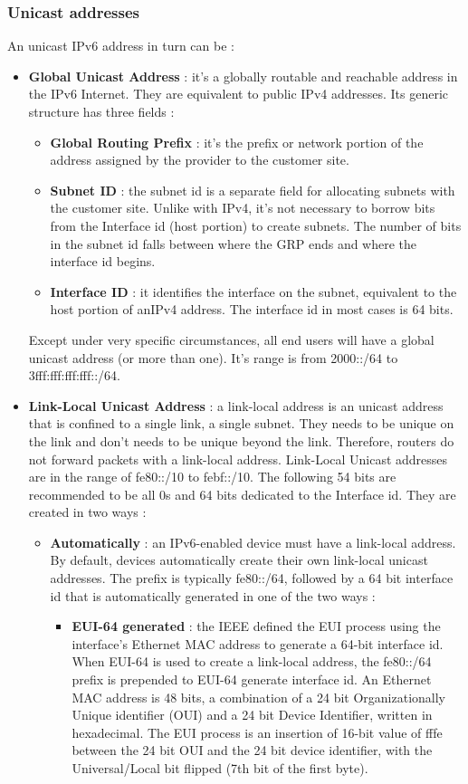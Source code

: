 \documentclass[11pt]{article}
\begin{document}
\subsubsection{Unicast addresses}
An unicast IPv6 address in turn can be :
\begin{itemize}
\item \textbf{Global Unicast Address} : it's a globally routable and reachable address in the IPv6 Internet. They are equivalent to public IPv4 addresses. Its generic structure has three fields :
\begin{itemize}
\item \textbf{Global Routing Prefix} : it's the prefix or network portion of the address assigned by the provider to the customer site.
\item \textbf{Subnet ID} : the subnet id is a separate field for allocating subnets with the customer site. Unlike with IPv4, it's not necessary to borrow bits from the Interface id (host portion) to create subnets. The number of bits in the subnet id falls between where the GRP ends and where the interface id begins.
\item \textbf{Interface ID} : it identifies the interface on the subnet, equivalent to the host portion of anIPv4 address. The interface id in most cases is 64 bits.
\end{itemize}
 Except under very specific circumstances, all end users will have a global unicast address (or more than one). It's range is from 2000::/64 to 3fff:fff:fff:fff::/64.
\item \textbf{Link-Local Unicast Address} : a link-local address is an unicast address that is confined to a single link, a single subnet. They needs to be unique on the link and don't needs to be unique beyond the link. Therefore, routers do not forward packets with a link-local address. Link-Local Unicast  addresses are in the range of fe80::/10 to febf::/10. The following 54 bits are recommended to be all 0s and 64 bits dedicated to the Interface id. They are created in two ways :
\begin{itemize}
\item \textbf{Automatically} : an IPv6-enabled device must have a link-local address. By default, devices automatically create their own link-local unicast addresses. The prefix is typically fe80::/64, followed by a 64 bit interface id that is automatically generated in one of the two ways :
\begin{itemize}
\item \textbf{EUI-64 generated} : the IEEE defined the EUI process using the interface's Ethernet MAC address to generate a 64-bit interface id. When EUI-64 is used to create a link-local address, the fe80::/64 prefix is prepended to EUI-64 generate interface id. An Ethernet MAC address is 48  bits, a combination of a 24 bit Organizationally Unique identifier (OUI) and a 24 bit Device Identifier, written in hexadecimal. The EUI process is an insertion of 16-bit value of fffe between the 24 bit OUI and the 24 bit device identifier, with the Universal/Local bit flipped (7th bit of the first byte).       

\end{itemize}
\end{itemize}
\end{itemize}
\end{document}
